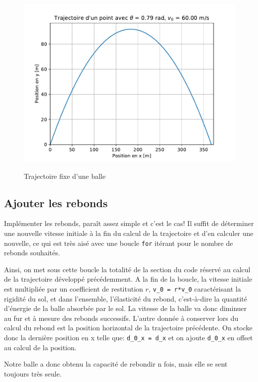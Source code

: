 \documentclass[a4paper,11pt]{article}
\begin{document}
\begin{figure}[H]
	\centering
	\includegraphics[scale=0.5]{imgtraject_fixe.pdf}
	\label{fig:traject} \caption{Trajectoire fixe d'une balle}
\end{figure}

\subsection{Ajouter les rebonds}

Implémenter les rebonds, paraît assez simple et c'est le cas! Il suffit de déterminer une nouvelle vitesse initiale à la fin du calcul de la trajectoire et d'en calculer une nouvelle, ce qui est très aisé avec une boucle \verb|for| itérant pour le nombre de rebonds souhaités.

Ainsi, on met sous cette boucle la totalité de la section du code réservé au calcul de la trajectoire développé précédemment. A la fin de la boucle, la vitesse initiale est multipliée par un coefficient de restitution $r$, \verb|v_0 = r*v_0| caractérisant la rigidité du sol, et dans l'ensemble, l'élasticité du rebond, c'est-à-dire la quantité d'énergie de la balle absorbée par le sol. La vitesse de la balle va donc diminuer au fur et à mesure des rebonds successifs. L'autre donnée à conserver lors du calcul du rebond est la position horizontal de la trajectoire précédente. On stocke donc la dernière position en x telle que: \verb|d_0_x = d_x| et on ajoute \verb|d_0_x| en offset au calcul de la position. 

Notre balle a donc obtenu la capacité de rebondir n fois, mais elle se sent toujours très seule.
\end{document}

